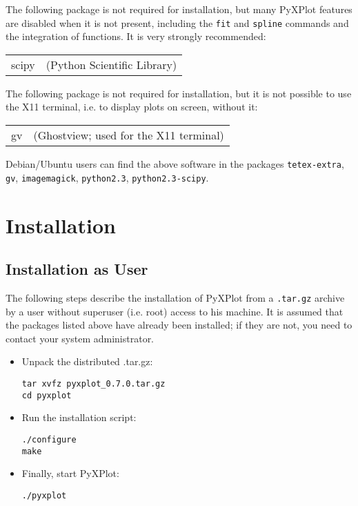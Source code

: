 The following package is not required for installation, but many PyXPlot
features are disabled when it is not present, including the \texttt{fit} and
\texttt{spline} commands and the integration of functions. It is very strongly
recommended:

\vspace{0.5cm}
\begin{tabular}{ll} 
scipy   & (Python Scientific Library) \\
\end{tabular}
\vspace{0.5cm}

The following package is not required for installation, but it is not possible
to use the X11 terminal, i.e. to display plots on screen, without it:

\vspace{0.5cm}
\begin{tabular}{ll}
gv      & (Ghostview; used for the X11 terminal) \\
\end{tabular}
\vspace{0.5cm}

Debian/Ubuntu users can find the above software in the packages \texttt{tetex-extra},
\texttt{gv}, \texttt{imagemagick}, \texttt{python2.3},
\texttt{python2.3-scipy}.

\section{Installation}

\subsection{Installation as User}

The following steps describe the installation of PyXPlot from a
\texttt{.tar.gz} archive by a user without superuser (i.e. root) access to his
machine. It is assumed that the packages listed above have already been
installed; if they are not, you need to contact your system administrator.

\begin{itemize}
\item Unpack the distributed .tar.gz:

\begin{verbatim}
tar xvfz pyxplot_0.7.0.tar.gz
cd pyxplot
\end{verbatim}

\item Run the installation script:

\begin{verbatim}
./configure
make
\end{verbatim}

\item Finally, start PyXPlot:

\begin{verbatim}
./pyxplot
\end{verbatim}

\end{itemize}

